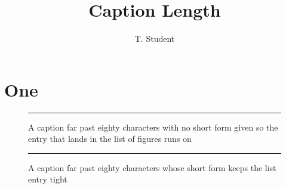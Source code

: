 \documentclass[phd,@OPTIONS@,12pt,a4paper]{bangor}
\title{Caption Length}
\author{T. Student}
\begin{document}
\maketitle
\chapter{One}
\begin{figure}[htbp]
  \centering
  \rule{3cm}{1.5cm}
  \caption{A caption far past eighty characters with no short form given so the entry that lands in the list of figures runs on}
\end{figure}
\begin{figure}[htbp]
  \centering
  \rule{3cm}{1.5cm}
  \caption[Short]{A caption far past eighty characters whose short form keeps the list entry tight}
\end{figure}
\end{document}
